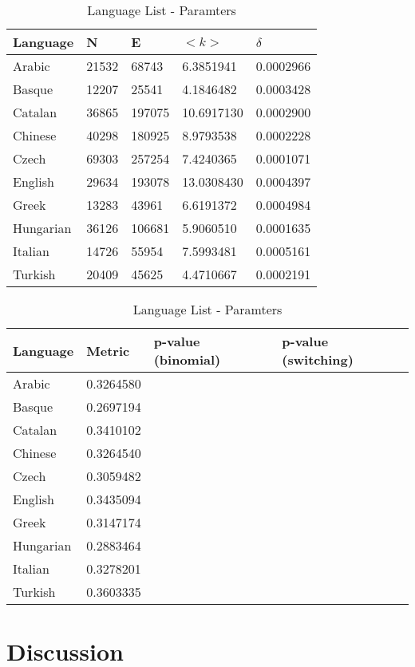 \documentclass[12pt, a4paper]{article}
\begin{document}
\begin{table}[H]
    \centering
    \begin{tabular}{l l l l l}
    Language & N & E & $<k>$ & $\delta$ \\
     \hline
    Arabic & 21532 & 68743 & 6.3851941 & 0.0002966 \\
    Basque & 12207 & 25541 & 4.1846482 & 0.0003428 \\
    Catalan & 36865 & 197075 & 10.6917130 & 0.0002900 \\
    Chinese & 40298 & 180925 & 8.9793538 & 0.0002228 \\
    Czech & 69303 & 257254 & 7.4240365 & 0.0001071 \\
    English & 29634 & 193078 & 13.0308430 & 0.0004397 \\
    Greek & 13283 & 43961 & 6.6191372 & 0.0004984 \\
    Hungarian & 36126 & 106681 & 5.9060510 & 0.0001635 \\
    Italian & 14726 & 55954 & 7.5993481 & 0.0005161 \\
    Turkish & 20409 & 45625 & 4.4710667 & 0.0002191 \\
    \end{tabular}
   \caption{Language List - Paramters}
   \label{table:1}
\end{table}

\begin{table}[H]
  \centering
  \begin{tabular}{l l l l}
  Language & Metric & p-value (binomial) & p-value (switching)\\
   \hline
   Arabic & 0.3264580  & & \\
   Basque & 0.2697194  & & \\
   Catalan & 0.3410102 & & \\
   Chinese & 0.3264540 & & \\
   Czech & 0.3059482 & & \\
   English & 0.3435094  & & \\
   Greek & 0.3147174  & & \\
   Hungarian & 0.2883464 & & \\
   Italian & 0.3278201 & & \\
   Turkish & 0.3603335  & & \\
     \end{tabular}
 \caption{Language List - Paramters}
 \label{table:2}
\end{table}


\section{Discussion}
\end{document}
